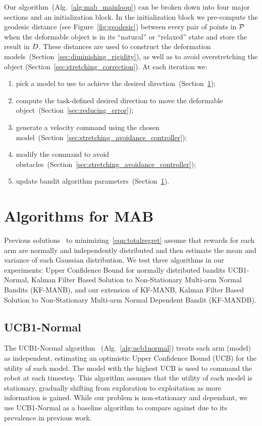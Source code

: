 Our algorithm~(Alg.~\ref{alg:mab_mainloop}) can be broken down into four major sections and an initialization block. In the initialization block we pre-compute the geodesic distance (see Figure~\ref{fig:geodesic}) between every pair of points in $\mathcal{P}$ when the deformable object is in its ``natural'' or ``relaxed'' state and store the result in $D$. These distances are used to construct the deformation models~(Section~\ref{sec:diminishing_rigidity}), as well as to avoid overstretching the object (Section~\ref{sec:stretching_correction}).
At each iteration we: 
\begin{enumerate}
    \item pick a model to use to achieve the desired direction~(Section~\ref{sec:bandit_algorithms}); 
    \item compute the task-defined desired direction to move the deformable object~(Section~\ref{sec:reducing_error}); 
    \item generate a velocity command using the chosen model~(Section~\ref{sec:stretching_avoidance_controller}); 
    \item modify the command to avoid obstacles~(Section~\ref{sec:stretching_avoidance_controller});
    \item update bandit algorithm parameters~(Section~\ref{sec:bandit_algorithms}).
\end{enumerate}


\section{Algorithms for MAB}
\label{sec:bandit_algorithms}

Previous solutions~\cite{Auer2002,Granmo2010} to minimizing~\eqref{eqn:totalregret} assume that rewards for each arm are normally and independently distributed and then estimate the mean and variance of each Gaussian distribution.  We test three algorithms in our experiments: Upper Confidence Bound for normally distributed bandits UCB1-Normal, Kalman Filter Based Solution to Non-Stationary Multi-arm Normal Bandits (KF-MANB), and our extension of KF-MANB, Kalman Filter Based Solution to Non-Stationary Multi-arm Normal Dependent Bandit (KF-MANDB).

\subsection{UCB1-Normal}
The UCB1-Normal algorithm~\cite{Auer2002} (Alg.~\ref{alg:ucb1normal}) treats each arm (model) as independent, estimating an optimistic Upper Confidence Bound (UCB) for the utility of each model. The model with the highest UCB is used to command the robot at each timestep. This algorithm assumes that the utility of each model is stationary, gradually shifting from exploration to exploitation as more information is gained. While our problem is non-stationary and dependant, we use UCB1-Normal as a baseline algorithm to compare against due to its prevalence in previous work.

